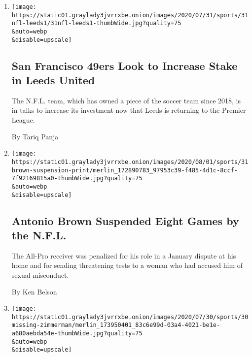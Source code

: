 \begin{enumerate}
\def\labelenumi{\arabic{enumi}.}
\item
  \href{/2020/07/31/sports/soccer/leeds-united-san-francisco-49ers.html}{}

  \texttt{[image: https://static01.graylady3jvrrxbe.onion/images/2020/07/31/sports/31nfl-leeds1/31nfl-leeds1-thumbWide.jpg?quality=75\\\&auto=webp\\\&disable=upscale]}

  \hypertarget{san-francisco-49ers-look-to-increase-stake-in-leeds-united}{%
  \subsection{San Francisco 49ers Look to Increase Stake in Leeds
  United}\label{san-francisco-49ers-look-to-increase-stake-in-leeds-united}}

  The N.F.L. team, which has owned a piece of the soccer team since
  2018, is in talks to increase its investment now that Leeds is
  returning to the Premier League.

  By Tariq Panja
\item
  \href{/2020/07/31/sports/football/antonio-brown-suspension-nfl.html}{}

  \texttt{[image: https://static01.graylady3jvrrxbe.onion/images/2020/08/01/sports/31brown-suspension-print/merlin\_172890783\_97953c39-f485-4d1c-8ccf-7f92169815a0-thumbWide.jpg?quality=75\\\&auto=webp\\\&disable=upscale]}

  \hypertarget{antonio-brown-suspended-eight-games-by-the-nfl}{%
  \subsection{Antonio Brown Suspended Eight Games by the
  N.F.L.}\label{antonio-brown-suspended-eight-games-by-the-nfl}}

  The All-Pro receiver was penalized for his role in a January dispute
  at his home and for sending threatening tests to a woman who had
  accused him of sexual misconduct.

  By Ken Belson
\item
  \href{/2020/07/30/sports/players-opt-out.html}{}

  \texttt{[image: https://static01.graylady3jvrrxbe.onion/images/2020/07/30/sports/30missing-zimmerman/merlin\_173950401\_83c6e99d-03a4-4021-be1e-a680aebda54e-thumbWide.jpg?quality=75\\\&auto=webp\\\&disable=upscale]}

  \hypertarget{sports-are-back-here-are-some-athletes-who-are-not}{%
}
\end{enumerate}
